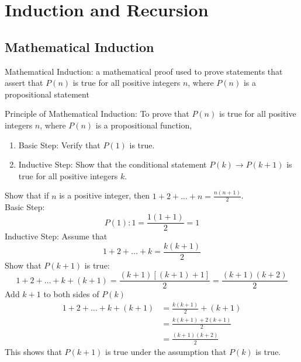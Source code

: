\documentclass[12pt]{article}
\begin{document}
\section{Induction and Recursion}
\subsection{Mathematical Induction}
\begin{definition} Mathematical Induction: a mathematical proof used to prove statements that assert that $P(n)$ is true for all positive integers $n$, where $P(n)$ is a propositional statement \end{definition} 
Principle of Mathematical Induction: To prove that $P(n)$ is true for all positive integers $n$, where $P(n)$ is a propositional function, \begin{enumerate} \item Basic Step: Verify that $P(1)$ is true. \item Inductive Step: Show that the conditional statement $P(k) \to P(k + 1)$ is true for all positive integers $k$. \end{enumerate} 
\begin{example} Show that if $n$ is a positive integer, then $1 + 2 + \dots + n = \frac{n(n + 1)}{2} $. \\ 
Basic Step: $$P(1): 1 = \frac{1(1 + 1)}{2} = 1$$ 
Inductive Step: Assume that $$ 1 + 2 + \dots + k = \frac{k(k + 1)}{2}$$ Show that $P(k + 1)$ is true: $$1 + 2 + \dots + k + (k + 1) = \frac{(k + 1)[(k + 1) + 1]}{2} = \frac{(k + 1)(k + 2)}{2}$$ Add $k + 1$ to both sides of $P(k)$ $$\begin{aligned} 1 + 2 + \dots + k + (k + 1) &= \frac{k(k + 1)}{2} + (k + 1) \\ &= \frac{k(k + 1) + 2(k + 1)}{2} \\ &= \frac{(k + 1)(k + 2)}{2} \end{aligned} $$ This shows that $P(k + 1)$ is true under the assumption that $P(k)$ is true. \end{example} 
\end{document}
